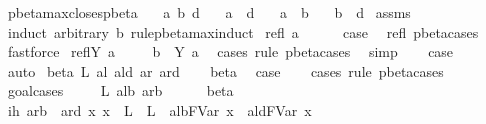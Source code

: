 \begin{isabellebody}
\ pbeta{\isacharunderscore}max{\isacharunderscore}closes{\isacharunderscore}pbeta{\isacharcolon}\isanewline
\ \ \ a\ b\ d\isanewline
\ \ \ {\isachardoublequoteopen}a\ {\isachargreater}{\isachargreater}{\isachargreater}\ d{\isachardoublequoteclose}\isanewline
\ \ \ {\isachardoublequoteopen}a\ {\isasymggreater}\ b{\isachardoublequoteclose}\isanewline
\ \ \ {\isachardoublequoteopen}b\ {\isasymggreater}\ d{\isachardoublequoteclose}\isanewline
%
\isadelimproof
%
\endisadelimproof
%
\isatagproof
{}\isamarkupfalse%
\ assms\ \isamarkupfalse%
\ {\isacharparenleft}induct\ arbitrary{\isacharcolon}\ b\ rule{\isacharcolon}pbeta{\isacharunderscore}max{\isachardot}induct{\isacharparenright}\isanewline
{}\isamarkupfalse%
\ {\isacharparenleft}refl\ a{\isacharparenright}\ \ \isanewline
\ \ \isamarkupfalse%
\ {\isacharquery}case\ \isamarkupfalse%
\ refl\ pbeta{\isachardot}cases\ \isamarkupfalse%
\ fastforce\isanewline
{}\isamarkupfalse%
\isanewline
{}\isamarkupfalse%
\ {\isacharparenleft}reflY\ a{\isacharparenright}\ \isamarkupfalse%
\ \isamarkupfalse%
\ {}{\isacharcolon}\ {\isachardoublequoteopen}b\ {\isacharequal}\ Y\ a{\isachardoublequoteclose}\ \isamarkupfalse%
\ {\isacharparenleft}cases\ rule{\isacharcolon}\ pbeta{\isachardot}cases{\isacharparenright}\ \isamarkupfalse%
\ simp\isanewline
\ \ \isamarkupfalse%
\ {\isacharquery}case\ \isamarkupfalse%
\ {}\ \isamarkupfalse%
\ auto\isanewline
{}\isamarkupfalse%
\isanewline
{}\isamarkupfalse%
\ {\isacharparenleft}beta\ L\ al\ ald\ ar\ ard{\isacharparenright}\isanewline
\ \ \isamarkupfalse%
\ beta{\isacharparenleft}{}{\isacharparenright}\ \isamarkupfalse%
\ {\isacharquery}case\isanewline
\ \ \isamarkupfalse%
\ {\isacharparenleft}cases\ rule{\isacharcolon}\ pbeta{\isachardot}cases{\isacharparenright}\isanewline
\ \ \isamarkupfalse%
\ goal{\isacharunderscore}cases\isanewline
\ \ \isamarkupfalse%
\ {\isacharparenleft}{}\ L{\isacharprime}\ alb\ arb{\isacharparenright}\isanewline
\ \ \ \ \isamarkupfalse%
\ beta\ \isamarkupfalse%
\ ih{\isacharcolon}\ {\isachardoublequoteopen}arb\ {\isasymggreater}\ ard{\isachardoublequoteclose}\ {\isachardoublequoteopen}{\isasymAnd}x{\isachardot}\ x\ {\isasymnotin}\ L\ {\isasymunion}\ L{\isacharprime}\ {\isasymLongrightarrow}\ alb{\isacharcircum}FVar\ x\ {\isasymggreater}\ ald{\isacharcircum}FVar\ x{\isachardoublequoteclose}\ \ \isamarkupfalse%

\end{isabellebody}
